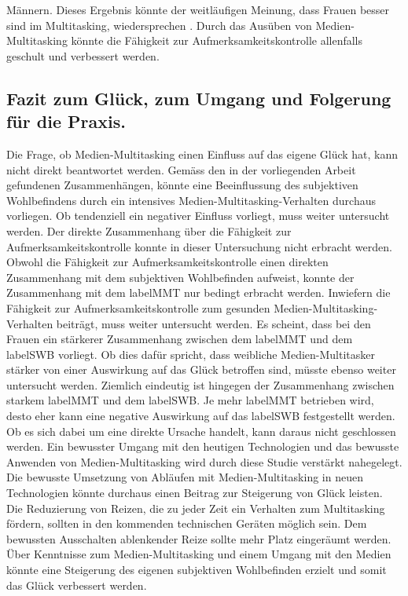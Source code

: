 Männern. Dieses Ergebnis könnte der weitläufigen Meinung, dass Frauen besser sind im Multitasking, wiedersprechen \cite{Oconnell2002}. Durch das Ausüben von Medien-Multitasking könnte die Fähigkeit zur Aufmerksamkeitskontrolle allenfalls geschult und verbessert werden.

\subsection{Fazit zum Glück, zum Umgang und Folgerung für die Praxis.}
Die Frage, ob Medien-Multitasking einen Einfluss auf das eigene Glück hat, kann nicht direkt beantwortet werden. Gemäss den in der vorliegenden Arbeit gefundenen Zusammenhängen, könnte eine Beeinflussung des subjektiven Wohlbefindens durch ein intensives Medien-Multitasking-Verhalten durchaus vorliegen. Ob tendenziell ein negativer Einfluss vorliegt, muss weiter untersucht werden. Der direkte Zusammenhang über die Fähigkeit zur Aufmerksamkeitskontrolle konnte in dieser Untersuchung nicht erbracht werden. Obwohl die Fähigkeit zur Aufmerksamkeitskontrolle einen direkten Zusammenhang mit dem subjektiven Wohlbefinden aufweist, konnte der Zusammenhang mit dem \gls{labelMMT} nur bedingt erbracht werden. Inwiefern die Fähigkeit zur Aufmerksamkeitskontrolle zum gesunden Medien-Multitasking-Verhalten beiträgt, muss weiter untersucht werden. Es scheint, dass bei den Frauen ein stärkerer Zusammenhang zwischen dem \gls{labelMMT} und dem \gls{labelSWB} vorliegt. Ob dies dafür spricht, dass weibliche Medien-Multitasker stärker von einer Auswirkung auf das Glück betroffen sind, müsste ebenso weiter untersucht werden. Ziemlich eindeutig ist hingegen der Zusammenhang zwischen starkem \gls{labelMMT} und dem \gls{labelSWB}. Je mehr \gls{labelMMT}  betrieben wird, desto eher kann eine negative Auswirkung auf das \gls{labelSWB} festgestellt werden. Ob es sich dabei um eine direkte Ursache handelt, kann daraus nicht geschlossen werden. Ein bewusster Umgang mit den heutigen Technologien und das bewusste Anwenden von Medien-Multitasking wird durch diese Studie verstärkt nahegelegt. Die bewusste Umsetzung von Abläufen mit Medien-Multitasking in neuen Technologien könnte durchaus einen Beitrag zur Steigerung von Glück leisten. Die Reduzierung von Reizen, die zu jeder Zeit ein Verhalten zum Multitasking fördern, sollten in den kommenden technischen Geräten möglich sein. Dem bewussten Ausschalten ablenkender Reize sollte mehr Platz eingeräumt werden. Über Kenntnisse zum Medien-Multitasking und einem Umgang mit den Medien könnte eine Steigerung des eigenen subjektiven Wohlbefinden erzielt und somit das Glück verbessert werden.

